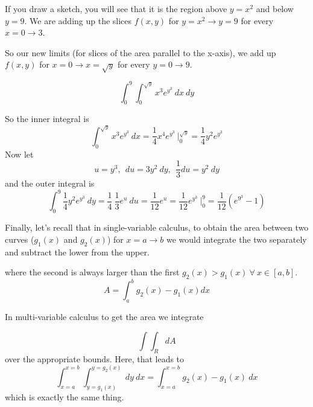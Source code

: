 \documentclass[11pt, oneside]{article}   	%
\begin{document}
If you draw a sketch, you will see that it is the region above $y=x^2$ and below $y=9$.  We are adding up the slices $f(x,y)$ for $y=x^2 \to y=9$ for every $x = 0 \to 3$.

So our new limits (for slices of the area parallel to the x-axis), we add up $f(x,y)$ for $x=0 \to x=\sqrt{y}$ for every $y = 0 \to 9$.

\[ \int_{0}^9 \int_0^{\sqrt{y}} x^3 e^{y^3} \ dx \ dy \]

So the inner integral is
\[ \int_0^{\sqrt{y}} x^3 e^{y^3} \ dx = \frac{1}{4}x^4 e^{y^3} \ \bigg |_{0}^{\sqrt{y}} = \frac{1}{4}y^2 e^{y^3} \]
Now let 
\[ u = y^3, \ \ du = 3y^2 \ dy, \ \ \frac{1}{3} du = y^2 \ dy \]
and the outer integral is
\[ \int_{0}^9 \frac{1}{4}y^2 e^{y^3} \ dy = \frac{1}{4} \ \frac{1}{3} e^u \ du = \frac{1}{12} e^u = \frac{1}{12} e^{y^3}   \ \bigg |_{0}^9 = \frac{1}{12} (e^{9^3} - 1)\]

Finally, let's recall that in single-variable calculus, to obtain the area between two curves ($g_1(x)$ and $g_2(x)$) for $x = a \to b$ we would integrate the two separately and subtract the lower from the upper.
\vspace{2 mm}

\noindent where the second is always larger than the first $g_2(x) > g_1(x) \ \forall \ x \in [a,b] $.
\[ A = \int_a^b g_2(x) - g_1(x) dx \]

In multi-variable calculus to get the area we integrate

\[ \int \int_R dA \]
over the appropriate bounds.  Here, that leads to
\Large
\[ \int_{x=a}^{x=b} \int_{y=g_1(x)}^{y=g_2(x)} \ dy \ dx = \int_{x=a}^{x=b} g_2(x) - g_1(x) \ dx \]
\large
which is exactly the same thing.
\end{document}

